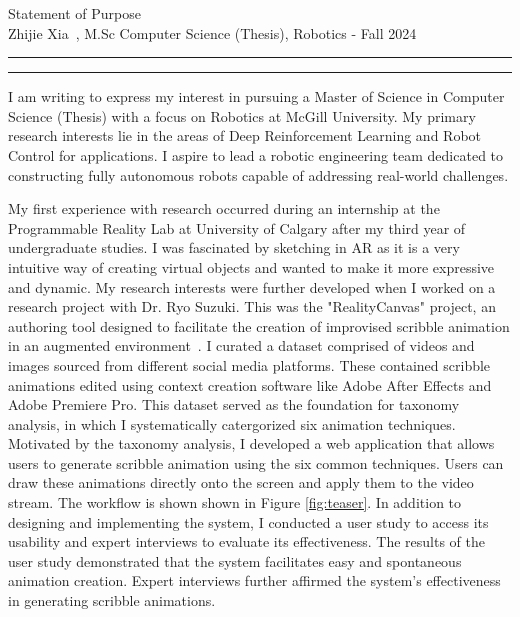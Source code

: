 \documentclass{article}
\newcommand{\soptitle}{Statement of Purpose}
\newcommand{\yourname}{Zhijie Xia}
\begin{document}
\begin{center}\LARGE\soptitle\\
\large \yourname\ , M.Sc Computer Science (Thesis), Robotics - Fall 2024
\end{center}

\hrule
\vspace{1pt}
\hrule height 1pt

\bigskip

I am writing to express my interest in pursuing a Master of Science in 
Computer Science (Thesis) with a focus on Robotics at McGill University.
My primary research interests lie in the areas of Deep Reinforcement Learning and Robot Control for applications.
I aspire to lead a robotic engineering team dedicated to constructing fully autonomous robots capable of addressing
real-world challenges.

My first experience with research occurred during an internship at the Programmable Reality Lab at University of Calgary 
after my third year of undergraduate studies. I was fascinated by sketching in AR as it is
a very intuitive way of creating virtual objects and wanted 
to make it more expressive and dynamic. 
My research interests were further developed when I worked on a research project with Dr. Ryo Suzuki. 
This was the "RealityCanvas" project, an authoring tool designed to facilitate the creation
of improvised scribble animation in an augmented environment~\cite{xia2023realitycanvas}.
I curated a dataset comprised of videos and images sourced from different social media platforms.
These contained scribble animations edited using context creation software like Adobe After Effects and Adobe Premiere Pro. 
This dataset served as the foundation for taxonomy analysis, in which I systematically catergorized
six animation techniques. Motivated by the taxonomy analysis,
I developed a web application that allows users to generate scribble animation using the six common techniques. 
Users can draw these animations directly onto the screen and apply them to the video stream. The workflow 
is shown shown in Figure \ref{fig:teaser}. In addition to designing and implementing the system, I conducted a user study to access its usability and expert
interviews to evaluate its effectiveness. The results of the user study demonstrated that the system facilitates
easy and spontaneous animation creation. Expert interviews further affirmed the system's effectiveness in generating 
scribble animations.
\end{document}
